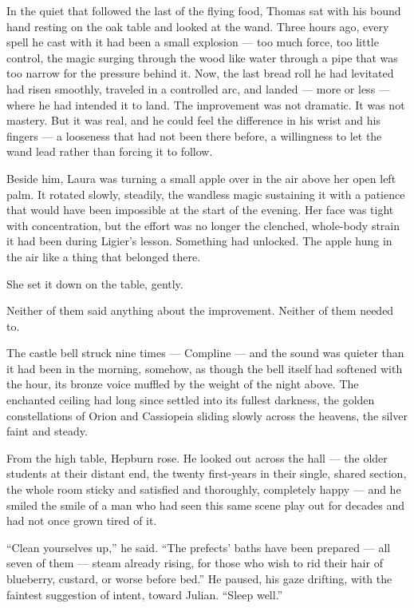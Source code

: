  
In the quiet that followed the last of the flying food, Thomas sat with his bound hand resting on the oak table and looked at the wand. Three hours ago, every spell he cast with it had been a small explosion --- too much force, too little control, the magic surging through the wood like water through a pipe that was too narrow for the pressure behind it. Now, the last bread roll he had levitated had risen smoothly, traveled in a controlled arc, and landed --- more or less --- where he had intended it to land. The improvement was not dramatic. It was not mastery. But it was real, and he could feel the difference in his wrist and his fingers --- a looseness that had not been there before, a willingness to let the wand lead rather than forcing it to follow.
 
Beside him, Laura was turning a small apple over in the air above her open left palm. It rotated slowly, steadily, the wandless magic sustaining it with a patience that would have been impossible at the start of the evening. Her face was tight with concentration, but the effort was no longer the clenched, whole-body strain it had been during Ligier's lesson. Something had unlocked. The apple hung in the air like a thing that belonged there.
 
She set it down on the table, gently.
 
Neither of them said anything about the improvement. Neither of them needed to.
 
The castle bell struck nine times --- Compline --- and the sound was quieter than it had been in the morning, somehow, as though the bell itself had softened with the hour, its bronze voice muffled by the weight of the night above. The enchanted ceiling had long since settled into its fullest darkness, the golden constellations of Orion and Cassiopeia sliding slowly across the heavens, the silver  faint and steady.
 
From the high table, Hepburn rose. He looked out across the hall --- the older students at their distant end, the twenty first-years in their single, shared section, the whole room sticky and satisfied and thoroughly, completely happy --- and he smiled the smile of a man who had seen this same scene play out for decades and had not once grown tired of it.
 
\enquote{Clean yourselves up,} he said. \enquote{The prefects' baths have been prepared --- all seven of them --- steam already rising, for those who wish to rid their hair of blueberry, custard, or worse before bed.} He paused, his gaze drifting, with the faintest suggestion of intent, toward Julian. \enquote{Sleep well.}
 

